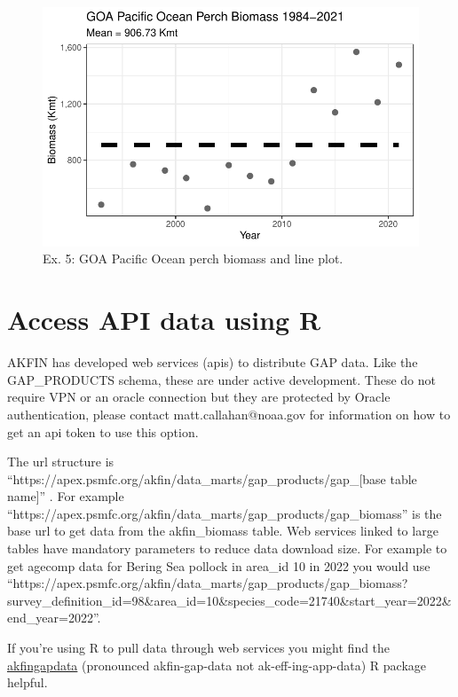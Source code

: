 \documentclass[
  letterpaper,
  oneside,
  open=any]{scrbook}
\begin{document}
\begin{figure}[H]

{\centering \includegraphics{content/akfin-oracle-sql-r_files/figure-pdf/test-5-fig-1.pdf}

}

\caption{Ex. 5: GOA Pacific Ocean perch biomass and line plot.}

\end{figure}

\hypertarget{access-api-data-using-r}{%
\chapter{Access API data using R}\label{access-api-data-using-r}}

AKFIN has developed web services (apis) to distribute GAP data. Like the
GAP\_PRODUCTS schema, these are under active development. These do not
require VPN or an oracle connection but they are protected by Oracle
authentication, please contact matt.callahan@noaa.gov for information on
how to get an api token to use this option.

The url structure is
``https://apex.psmfc.org/akfin/data\_marts/gap\_products/gap\_{[}base
table name{]}'' . For example
``https://apex.psmfc.org/akfin/data\_marts/gap\_products/gap\_biomass''
is the base url to get data from the akfin\_biomass table. Web services
linked to large tables have mandatory parameters to reduce data download
size. For example to get agecomp data for Bering Sea pollock in area\_id
10 in 2022 you would use
``https://apex.psmfc.org/akfin/data\_marts/gap\_products/gap\_biomass?survey\_definition\_id=98\&area\_id=10\&species\_code=21740\&start\_year=2022\&end\_year=2022''.

If you're using R to pull data through web services you might find the
\href{https://github.com/MattCallahan-NOAA/akfingapdata/tree/main}{akfingapdata}
(pronounced akfin-gap-data not ak-eff-ing-app-data) R package helpful.
\end{document}
